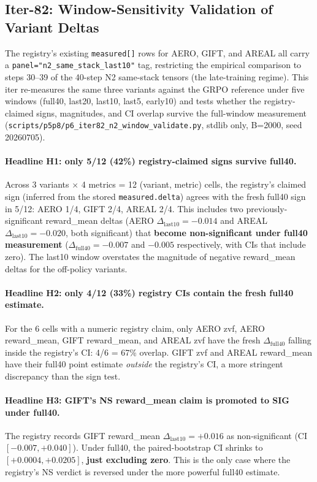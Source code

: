 \subsection{Iter-82: Window-Sensitivity Validation of Variant Deltas}
\label{sec:p6-iter82-window-sensitivity}

The registry's existing \texttt{measured[]} rows for AERO, GIFT, and AREAL
all carry a \texttt{panel="n2\_same\_stack\_last10"} tag, restricting
the empirical comparison to steps 30--39 of the 40-step N2 same-stack
tensors (the late-training regime). This iter re-measures the same
three variants against the GRPO reference under five windows
(full40, last20, last10, last5, early10) and tests whether the
registry-claimed signs, magnitudes, and CI overlap survive the
full-window measurement
(\texttt{scripts/p5p8/p6\_iter82\_n2\_window\_validate.py}, stdlib only,
B=2000, seed 20260705).

\paragraph{Headline H1: only 5/12 (42\%) registry-claimed signs survive full40.}
Across 3 variants $\times$ 4 metrics = 12 (variant, metric) cells,
the registry's claimed sign (inferred from the stored
\texttt{measured.delta}) agrees with the fresh full40 sign in 5/12:
AERO 1/4, GIFT 2/4, AREAL 2/4. This includes two previously-significant
reward\_mean deltas (AERO $\Delta_{\text{last10}}=-0.014$ and
AREAL $\Delta_{\text{last10}}=-0.020$, both significant) that
\textbf{become non-significant under full40 measurement}
($\Delta_{\text{full40}}=-0.007$ and $-0.005$ respectively, with CIs
that include zero). The last10 window overstates the magnitude of
negative reward\_mean deltas for the off-policy variants.

\paragraph{Headline H2: only 4/12 (33\%) registry CIs contain the fresh full40 estimate.}
For the 6 cells with a numeric registry claim, only AERO zvf, AERO
reward\_mean, GIFT reward\_mean, and AREAL zvf have the fresh
$\Delta_{\text{full40}}$ falling inside the registry's CI:
4/6 = 67\% overlap. GIFT zvf and AREAL reward\_mean have their full40
point estimate \emph{outside} the registry's CI, a more stringent
discrepancy than the sign test.

\paragraph{Headline H3: GIFT's NS reward\_mean claim is promoted to SIG under full40.}
The registry records GIFT reward\_mean
$\Delta_{\text{last10}}=+0.016$ as non-significant (CI $[-0.007,
+0.040]$). Under full40, the paired-bootstrap CI shrinks to
$[+0.0004, +0.0205]$, \textbf{just excluding zero}. This is the only
case where the registry's NS verdict is reversed under the more
powerful full40 estimate.

